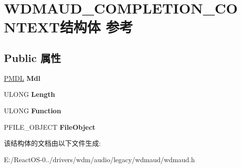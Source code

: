 \hypertarget{struct_w_d_m_a_u_d___c_o_m_p_l_e_t_i_o_n___c_o_n_t_e_x_t}{}\section{W\+D\+M\+A\+U\+D\+\_\+\+C\+O\+M\+P\+L\+E\+T\+I\+O\+N\+\_\+\+C\+O\+N\+T\+E\+X\+T结构体 参考}
\label{struct_w_d_m_a_u_d___c_o_m_p_l_e_t_i_o_n___c_o_n_t_e_x_t}
\subsection*{Public 属性}
\begin{DoxyCompactItemize}
\item 
\mbox{\label{struct_w_d_m_a_u_d___c_o_m_p_l_e_t_i_o_n___c_o_n_t_e_x_t_aefe2cb0bb3c21704888b77429d2b32a3}} 
\hyperlink{interfacevoid}{P\+M\+DL} {\bfseries Mdl}
\item 
\mbox{\label{struct_w_d_m_a_u_d___c_o_m_p_l_e_t_i_o_n___c_o_n_t_e_x_t_a044af82b031b18322a3210872926ec68}} 
U\+L\+O\+NG {\bfseries Length}
\item 
\mbox{\label{struct_w_d_m_a_u_d___c_o_m_p_l_e_t_i_o_n___c_o_n_t_e_x_t_a3101662ed17f88ca85e9bff506f15856}} 
U\+L\+O\+NG {\bfseries Function}
\item 
\mbox{\label{struct_w_d_m_a_u_d___c_o_m_p_l_e_t_i_o_n___c_o_n_t_e_x_t_adae4a1868dc1af0cb545b96d0e0bb614}} 
P\+F\+I\+L\+E\+\_\+\+O\+B\+J\+E\+CT {\bfseries File\+Object}
\end{DoxyCompactItemize}


该结构体的文档由以下文件生成\+:\begin{DoxyCompactItemize}
\item 
E\+:/\+React\+O\+S-\/0../drivers/wdm/audio/legacy/wdmaud/wdmaud.\+h\end{DoxyCompactItemize}
